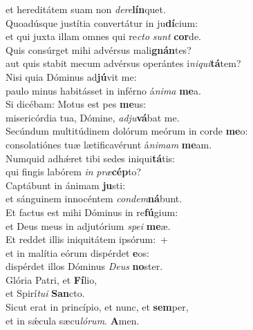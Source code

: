 \evenverse et hereditátem suam non \textit{de}\textit{re}\textbf{lín}quet.\\
\oddverse Quoadúsque justítia convertátur in ju\textbf{dí}cium:~\*\\
\oddverse et qui juxta illam omnes qui re\textit{cto} \textit{sunt} \textbf{cor}de.\\
\evenverse Quis consúrget mihi advérsus mali\textbf{gnán}tes?~\*\\
\evenverse aut quis stabit mecum advérsus operántes i\textit{ni}\textit{qui}\textbf{tá}tem?\\
\oddverse Nisi quia Dóminus ad\textbf{jú}vit me:~\*\\
\oddverse paulo minus habitásset in inférno á\textit{ni}\textit{ma} \textbf{me}a.\\
\evenverse Si dicébam: Motus est pes \textbf{me}us:~\*\\
\evenverse misericórdia tua, Dómine, \textit{ad}\textit{ju}\textbf{vá}bat me.\\
\oddverse Secúndum multitúdinem dolórum meórum in corde \textbf{me}o:~\*\\
\oddverse consolatiónes tuæ lætificavérunt á\textit{ni}\textit{mam} \textbf{me}am.\\
\evenverse Numquid adhǽret tibi sedes iniqui\textbf{tá}tis:~\*\\
\evenverse qui fingis labórem \textit{in} \textit{præ}\textbf{cép}to?\\
\oddverse Captábunt in ánimam \textbf{ju}sti:~\*\\
\oddverse et sánguinem innocéntem \textit{con}\textit{dem}\textbf{ná}bunt.\\
\evenverse Et factus est mihi Dóminus in re\textbf{fú}gium:~\*\\
\evenverse et Deus meus in adjutórium \textit{spe}\textit{i} \textbf{me}æ.\\
\oddverse Et reddet illis iniquitátem ipsórum:~+\\
\oddverse  et in malítia eórum dispérdet \textbf{e}os:~\*\\
\oddverse dispérdet illos Dóminus \textit{De}\textit{us} \textbf{no}ster.\\
\evenverse Glória Patri, et \textbf{Fí}lio,~\*\\
\evenverse et Spirí\textit{tu}\textit{i} \textbf{San}cto.\\
\oddverse Sicut erat in princípio, et nunc, et \textbf{sem}per,~\*\\
\oddverse et in sǽcula sæcu\textit{ló}\textit{rum}. \textbf{A}men.\\
